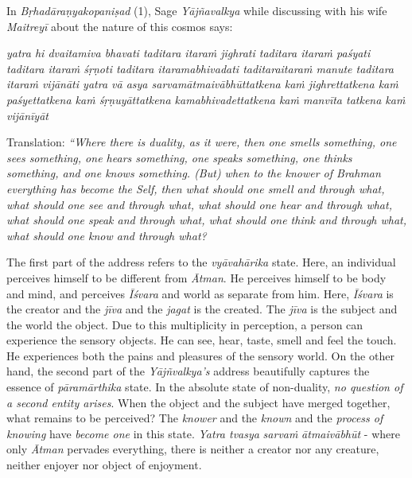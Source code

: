 In \emph{Bṛhadāraṇyakopaniṣad} (1), Sage \emph{Yājñavalkya} while discussing with his wife \emph{Maitreyī} about the nature of this cosmos says:

\emph{yatra hi dvaitamiva bhavati taditara itaraṁ jighrati taditara itaraṁ paśyati taditara itaraṁ śṛṇoti taditara itaramabhivadati taditara\break itaraṁ manute taditara itaraṁ vijānāti yatra vā asya sarvamātmai\-vābhūttatkena kaṁ jighrettatkena kaṁ paśyettatkena kaṁ śṛṇuyāttatkena kamabhivadettatkena kaṁ manvīta tatkena kaṁ vijānīyāt} 
\vskip 2.5pt

Translation: \emph{``Where there is duality, as it were, then one smells something, one sees something, one hears something, one speaks something, one thinks something, and one knows something. (But) when to the knower of Brahman everything has become the Self, then what should one smell and through what, what should one see and through what, what should one hear and through what, what should one speak and through what, what should one think and through what, what should one know and through what?}
\vskip 2.5pt

The first part of the address refers to the \emph{vyāvahārika} state. Here, an individual perceives himself to be different from \emph{Ātman}. He perceives himself to be body and mind, and perceives \emph{Īśvara} and world as separate from him. Here, \emph{Īśvara} is the creator and the \emph{jīva} and the \emph{jagat} is the created. The \emph{jīva} is the subject and the world the object. Due to this multiplicity in perception, a person can experience the sensory objects. He can see, hear, taste, smell and feel the touch. He experiences both the pains and pleasures of the sensory world. On the other hand, the second part of the \emph{Yājñvalkya's} address beautifully captures the essence of \emph{pāramārthika} state. In the absolute state of non-duality, \emph{no question of a second entity arises}. When the object and the subject have merged together, what remains to be perceived? The \emph{knower} and the \emph{known} and the \emph{process of knowing} have \emph{become one} in this state. \emph{Yatra tvasya} \emph{sarvaṁ} \emph{ātmaivābhūt} - where only \emph{Ātman} pervades everything, there is neither a creator nor any creature, neither enjoyer nor object of enjoyment.
\vskip 2.5pt

